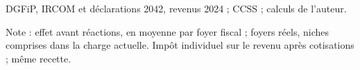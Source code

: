 DGFiP, IRCOM et déclarations 2042, revenus 2024 ; CCSS ; calculs de l'auteur.\par Note : effet avant réactions, en moyenne par foyer fiscal ; foyers réels, niches comprises dans la charge actuelle. Impôt individuel sur le revenu après cotisations ; même recette.
